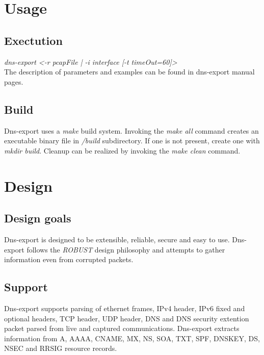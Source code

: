 \documentclass[a4paper, 12pt]{article}
\begin{document}
\section{Usage}
\subsection{Exectution}
\textit{dns-export \textless-r pcapFile | -i interface [-t timeOut=60]\textgreater \space [-s syslogServer]}\\
The description of parameters and examples can be found in dns-export manual pages.

\subsection{Build}
Dns-export uses a \textit{make} build system. Invoking the \textit{make all} command creates an executable binary file in \textit{/build} subdirectory. If one is not present, create one with \textit{mkdir build}. Cleanup can be realized by invoking the \textit{make clean} command.

\section{Design}
\subsection{Design goals}
Dns-export is designed to be extensible, reliable, secure and easy to use. Dns-export follows the \textit{ROBUST} design philosophy and attempts to gather information even from corrupted packets.

\subsection{Support}
Dns-export supports parsing of ethernet frames, IPv4 header, IPv6 fixed and optional headers, TCP header, UDP header, DNS and DNS security extention packet parsed from live and captured communications. Dns-export extracts information from A, AAAA, CNAME, MX, NS, SOA, TXT, SPF, DNSKEY, DS, NSEC and RRSIG resource records.
\end{document}
